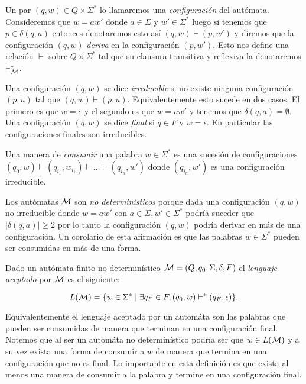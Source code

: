 \documentclass[tesis.tex]{subfiles}
\begin{document}
Un par $(q,w) \in Q \times \Sigma^*$ lo llamaremos una \emph{configuración} del autómata.
Consideremos que $w = aw'$ donde $a \in \Sigma$ y $w' \in \Sigma^*$ luego si tenemos que $p \in \delta(q,a) $ entonces denotaremos esto así $(q,w) \vdash (p,w')$ y diremos que la configuración $(q,w)$ \emph{deriva} en la configuración $(p,w')$.
Esto nos define una relación $\vdash$ sobre $Q \times \Sigma^*$ tal que su clausura transitiva y reflexiva la denotaremos $\vdash^*_{\cal M}$.

Una configuración $(q,w)$ se dice \emph{irreducible} si no existe ninguna configuración $(p,u)$ tal que $(q,w) \vdash (p,u)$.
Equivalentemente esto sucede en dos casos.
El primero es que $w = \epsilon$ y el segundo es que $w = aw'$ y tenemos que $\delta(q,a) = \emptyset$.
Una configuración $(q,w)$ se dice \emph{final} si $q \in F$ y $w = \epsilon$.
En particular las configuraciones finales son irreducibles.

Una manera de \emph{consumir} una palabra $w \in \Sigma^*$ es una sucesión de configuraciones $(q_0,w) \vdash (q_{i_{1}}, w_{i_{1}}) \vdash \dots \vdash (q_{i_{n}}, w')$ donde $(q_{i_{n}}, w')$ es una configuración irreducible.

\begin{obs}
	Los autómatas $\cal M$ son \emph{no determinísticos} porque dada una configuración $(q,w)$ no irreducible donde $w = aw'$ con $a \in \Sigma, w' \in \Sigma^*$ podría suceder que $|\delta(q,a)| \ge 2$ por lo tanto la configuración $(q,w)$ podría derivar en más de una configuración.
	Un corolario de esta afirmación es que las palabras $w \in \Sigma^*$ pueden ser consumidas en más de una forma.
\end{obs}



\begin{deff}
	Dado un autómata finito no determinístico ${\cal M} = (Q,q_0,\Sigma,\delta,F)$ el \emph{lenguaje aceptado} por $\cal M$ es el siguiente:
	
	\[
	L({\cal M} ) = \{  w \in \Sigma^*\mid \exists  q_F \in F  ,  (q_0,w) \vdash^* (q_F,\epsilon)     \}.
	\]
\end{deff}
Equivalentemente el lenguaje aceptado por un automáta son las palabras que pueden ser 
consumidas de manera que terminan en una configuración final.
Notemos que al ser un automáta no determinístico podría ser que $w \in L(\cal M)$ y a su vez exista una forma de consumir a $w$ de manera que termina en una configuración que no es final.
Lo importante en esta definición es que exista al menos una manera de consumir a la palabra y termine en una configuración final.
\end{document}
